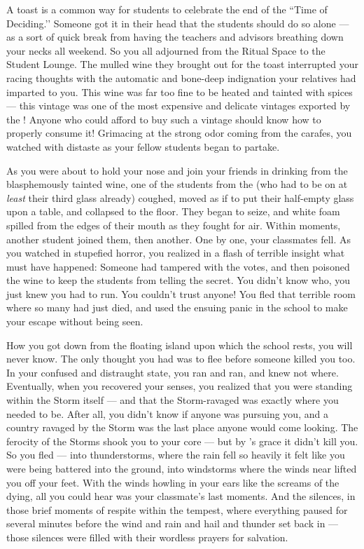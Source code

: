 \documentclass[char]{GL2020}
\begin{document}
A toast is a common way for students to celebrate the end of the ``Time of Deciding.’’ Someone got it in their head that the students should do so alone — as a sort of quick break from having the teachers and advisors breathing down your necks all weekend. So you all adjourned from the Ritual Space to the Student Lounge. The mulled wine they brought out for the toast interrupted your racing thoughts with the automatic and bone-deep indignation your \pFarm{} relatives had imparted to you. This wine was far too fine to be heated and tainted with spices — this vintage was one of the most expensive and delicate vintages exported by the \pFarm{}! Anyone who could afford to buy such a vintage should know how to properly consume it! Grimacing at the strong odor coming from the carafes, you watched with distaste as your fellow students began to partake.

As you were about to hold your nose and join your friends in drinking from the blasphemously tainted wine, one of the students from the \pFarm{} (who had to be on at \emph{least} their third glass already) coughed, moved as if to put their half-empty glass upon a table, and collapsed to the floor. They began to seize, and white foam spilled from the edges of their mouth as they fought for air. Within moments, another student joined them, then another. One by one, your classmates fell. As you watched in stupefied horror, you realized in a flash of terrible insight what must have happened: Someone had tampered with the votes, and then poisoned the wine to keep the students from telling the secret. You didn't know who, you just knew you had to run. You couldn't trust anyone! You fled that terrible room where so many had just died, and used the ensuing panic in the school to make your escape without being seen.

How you got down from the floating island upon which the school rests, you will never know. The only thought you had was to flee before someone killed you too. In your confused and distraught state, you ran and ran, and knew not where. Eventually, when you recovered your senses, you realized that you were standing within the Storm itself — and that the Storm-ravaged \pShip{} was exactly where you needed to be. After all, you didn't know if anyone was pursuing you, and a country ravaged by the Storm was the last place anyone would come looking. The ferocity of the Storms shook you to your core — but by \cFarmGod{\intro}'s grace it didn't kill you. So you fled — into thunderstorms, where the rain fell so heavily it felt like you were being battered into the ground, into windstorms where the winds near lifted you off your feet. With the winds howling in your ears like the screams of the dying, all you could hear was your classmate's last moments. And the silences, in those brief moments of respite within the tempest, where everything paused for several minutes before the wind and rain and hail and thunder set back in — those silences were filled with their wordless prayers for salvation.
\end{document}
